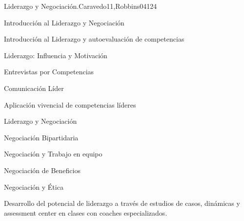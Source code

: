 \begin{syllabus}
\begin{unit}{Liderazgo y Negociación.}{}{Caravedo11,Robbins04}{12}{4}
   \begin{topics}
      \item Introducción al Liderazgo y Negociación
      \item Introducción al Liderazgo y autoevaluación de competencias
      \item Liderazgo: Influencia y Motivación
      \item Entrevistas por Competencias
      \item Comunicación Líder
      \item Aplicación vivencial de competencias líderes
      \item Liderazgo y Negociación
      \item Negociación Bipartidaria
      \item Negociación y Trabajo en equipo
      \item Negociación de Beneficios
      \item Negociación y Ética
      
   \end{topics}
   \begin{learningoutcomes}
      \item Desarrollo del potencial de liderazgo a través de estudios de casos, dinámicas y assessment center en clases con coaches especializados.
   \end{learningoutcomes}
\end{unit}



\begin{coursebibliography}
\end{coursebibliography}

\end{syllabus}
